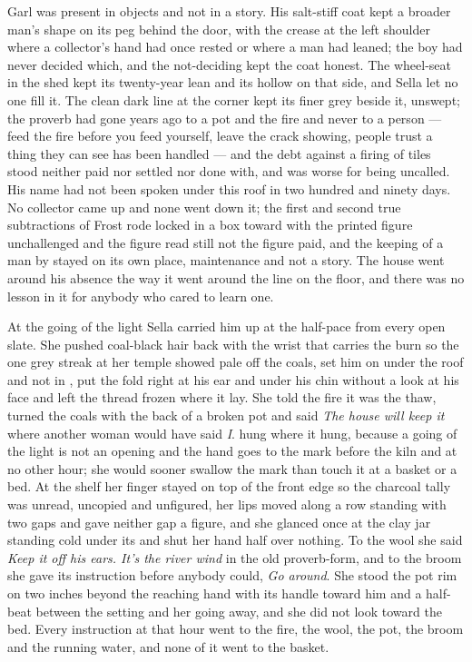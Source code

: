 Garl was present in objects and not in a story. His salt-stiff coat kept a broader man's shape on its peg behind the door, with the crease at the left shoulder where a collector's hand had once rested or where a man had leaned; the boy had never decided which, and the not-deciding kept the coat honest. The wheel-seat in the shed kept its twenty-year lean and its hollow on that side, and Sella let no one fill it. The clean dark line at the corner kept its finer grey beside it, unswept; the proverb had gone years ago to a pot and the fire and never to a person --- feed the fire before you feed yourself, leave the crack showing, people trust a thing they can see has been handled --- and the debt against a firing of tiles stood neither paid nor settled nor done with, and was worse for being uncalled. His name had not been spoken under this roof in two hundred and ninety days. No collector came up  and none went down it; the first and second true subtractions of Frost rode locked in a box toward  with the printed figure unchallenged and the figure read still not the figure paid, and the keeping of a man by  stayed on its own place, maintenance and not a story. The house went around his absence the way it went around the line on the floor, and there was no lesson in it for anybody who cared to learn one.

\scenebreak

At the going of the light Sella carried him up at the half-pace from every open slate. She pushed coal-black hair back with the wrist that carries the burn so the one grey streak at her temple showed pale off the coals, set him on  under the roof and not in , put the fold right at his ear and under his chin without a look at his face and left the thread frozen where it lay. She told the fire it was the thaw, turned the coals with the back of a broken pot and said \emph{The house will keep it} where another woman would have said \emph{I}.  hung where it hung, because a going of the light is not an opening and the hand goes to the mark before the kiln and at no other hour; she would sooner swallow the mark than touch it at a basket or a bed. At the shelf her finger stayed on top of the front edge so the charcoal tally was unread, uncopied and unfigured, her lips moved along a row standing with two gaps and gave neither gap a figure, and she glanced once at the clay jar standing cold under its  and shut her hand half over nothing. To the wool she said \emph{Keep it off his ears. It's the river wind} in the old proverb-form, and to the broom she gave its instruction before anybody could, \emph{Go around}. She stood the pot rim on  two inches beyond the reaching hand with its handle toward him and a half-beat between the setting and her going away, and she did not look toward the bed. Every instruction at that hour went to the fire, the wool, the pot, the broom and the running water, and none of it went to the basket.

